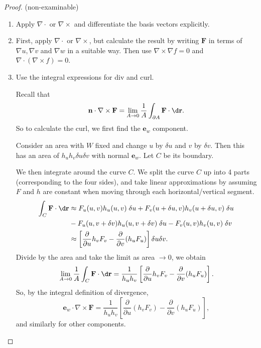 \documentclass[a4paper]{article}
\begin{document}
\begin{proof}(non-examinable)
  \begin{enumerate}
    \item Apply $\nabla\cdot$ or $\nabla\times$ and differentiate the basis vectors explicitly.
    \item First, apply $\nabla\cdot$ or $\nabla\times$, but calculate the result by writing $\mathbf{F}$ in terms of $\nabla u, \nabla v$ and $\nabla w$ in a suitable way. Then use $\nabla\times \nabla f = 0$ and $\nabla\cdot (\nabla\times f) = 0$.
    \item Use the integral expressions for div and curl.

      Recall that
      \[
        \mathbf{n}\cdot \nabla \times \mathbf{F} = \lim_{A \to 0}\frac{1}{A}\int_{\partial A}\mathbf{F}\cdot \d \mathbf{r}.
      \]
      So to calculate the curl, we first find the $\mathbf{e}_w$ component.

      Consider an area with $W$ fixed and change $u$ by $\delta u$ and $v$ by $\delta v$. Then this has an area of $h_u h_v \delta u\delta v$ with normal $\mathbf{e}_w$. Let $C$ be its boundary.
      \begin{center}
      \end{center}
      We then integrate around the curve $C$. We split the curve $C$ up into 4 parts (corresponding to the four sides), and take linear approximations by assuming $F$ and $h$ are constant when moving through each horizontal/vertical segment.
      \begin{align*}
        \int_C \mathbf{F}\cdot \d \mathbf{r} &\approx F_u(u, v) h_u(u, v)\;\delta u + F_v(u + \delta u, v) h_v(u + \delta u, v)\;\delta u \\
        &- F_u(u, v + \delta v)h_u (u, v + \delta v)\; \delta u - F_v(u, v)h_v(u, v)\;\delta v\\
        &\approx \left[\frac{\partial}{\partial u}h_vF_v - \frac{\partial}{\partial v}(h_uF_u)\right]\delta u\delta v.
      \end{align*}
      Divide by the area and take the limit as area $\to 0$, we obtain
      \[
        \lim_{A \to 0} \frac{1}{A}\int_C \mathbf{F}\cdot \d \mathbf{r} = \frac{1}{h_uh_v}\left[\frac{\partial}{\partial u}h_vF_v - \frac{\partial}{\partial v}(h_u F_u)\right].
      \]
      So, by the integral definition of divergence,
      \[
        \mathbf{e}_w\cdot \nabla\times \mathbf{F} = \frac{1}{h_uh_v}\left[\frac{\partial }{\partial u}(h_vF_v) - \frac{\partial }{\partial v}(h_uF_u)\right],
      \]
      and similarly for other components.


\end{enumerate}
\end{proof}
\end{document}
